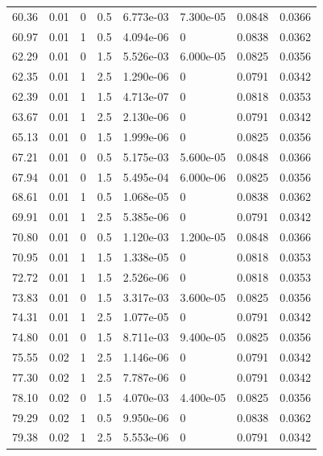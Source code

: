 \documentclass[preview]{standalone}
\begin{document}
{{{\begin{tabular}{L{1.2cm}C{1.2cm} C{0.3cm}C{0.5cm} C{1.4cm}C{1.4cm} C{1.4cm}C{1.4cm}}
  60.36  &  0.01  & 0     & 0.5 &  6.773e-03  & 7.300e-05  & 0.0848 &  0.0366   \\ 
  60.97  &  0.01  & 1     & 0.5 &  4.094e-06  & 0  & 0.0838 &  0.0362   \\ 
  62.29  &  0.01  & 0     & 1.5 &  5.526e-03  & 6.000e-05  & 0.0825 &  0.0356   \\ 
  62.35  &  0.01  & 1     & 2.5 &  1.290e-06  & 0  & 0.0791 &  0.0342   \\ 
  62.39  &  0.01  & 1     & 1.5 &  4.713e-07  & 0  & 0.0818 &  0.0353   \\ 
  63.67  &  0.01  & 1     & 2.5 &  2.130e-06  & 0  & 0.0791 &  0.0342   \\ 
  65.13  &  0.01  & 0     & 1.5 &  1.999e-06  & 0  & 0.0825 &  0.0356   \\ 
  67.21  &  0.01  & 0     & 0.5 &  5.175e-03  & 5.600e-05  & 0.0848 &  0.0366   \\ 
  67.94  &  0.01  & 0     & 1.5 &  5.495e-04  & 6.000e-06  & 0.0825 &  0.0356   \\ 
  68.61  &  0.01  & 1     & 0.5 &  1.068e-05  & 0  & 0.0838 &  0.0362   \\ 
  69.91  &  0.01  & 1     & 2.5 &  5.385e-06  & 0  & 0.0791 &  0.0342   \\ 
  70.80  &  0.01  & 0     & 0.5 &  1.120e-03  & 1.200e-05  & 0.0848 &  0.0366   \\ 
  70.95  &  0.01  & 1     & 1.5 &  1.338e-05  & 0  & 0.0818 &  0.0353   \\ 
  72.72  &  0.01  & 1     & 1.5 &  2.526e-06  & 0  & 0.0818 &  0.0353   \\ 
  73.83  &  0.01  & 0     & 1.5 &  3.317e-03  & 3.600e-05  & 0.0825 &  0.0356   \\ 
  74.31  &  0.01  & 1     & 2.5 &  1.077e-05  & 0  & 0.0791 &  0.0342   \\ 
  74.80  &  0.01  & 0     & 1.5 &  8.711e-03  & 9.400e-05  & 0.0825 &  0.0356   \\ 
  75.55  &  0.02  & 1     & 2.5 &  1.146e-06  & 0  & 0.0791 &  0.0342   \\ 
  77.30  &  0.02  & 1     & 2.5 &  7.787e-06  & 0  & 0.0791 &  0.0342   \\ 
  78.10  &  0.02  & 0     & 1.5 &  4.070e-03  & 4.400e-05  & 0.0825 &  0.0356   \\ 
  79.29  &  0.02  & 1     & 0.5 &  9.950e-06  & 0  & 0.0838 &  0.0362   \\ 
  79.38  &  0.02  & 1     & 2.5 &  5.553e-06  & 0  & 0.0791 &  0.0342   \\ 

\end{tabular}}}}
\end{document}
